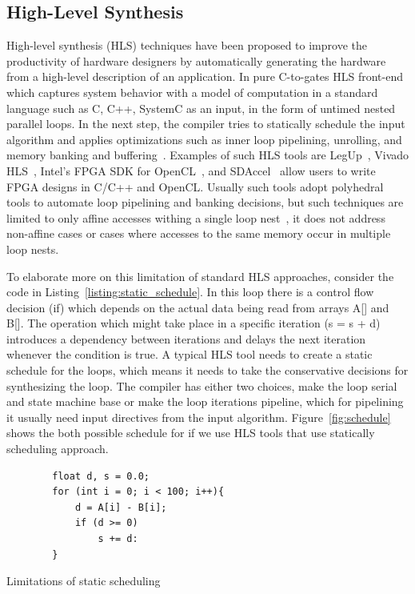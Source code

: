 \subsection{High-Level Synthesis}

High-level synthesis (HLS) techniques have been proposed to improve the productivity of hardware designers by automatically generating the hardware from a high-level description of an application.
In pure C-to-gates HLS front-end which captures system behavior with a model of computation in a standard language such as C, C++, SystemC as an input, in the form of untimed nested parallel loops.
In the next step, the compiler tries to statically schedule the input algorithm and applies optimizations such as inner loop pipelining, unrolling, and memory banking and buffering~\cite{chung_micro_2010, lee_1989_new, paulin_1989_force}.
Examples of such HLS tools are LegUp~\cite{canis_2011_legup}, Vivado HLS~\cite{vivadohls}, Intel’s FPGA SDK for OpenCL~\cite{opencl_sdk}, and SDAccel~\cite{sdaccel} allow users to write FPGA designs in C/C++ and OpenCL.
Usually such tools adopt polyhedral tools to automate loop pipelining and banking decisions, but such techniques are limited to only affine accesses withing a single loop nest~\cite{wang_2014_theory}, it does not address non-affine cases or cases where accesses to the same memory occur in multiple loop nests.

To elaborate more on this limitation of standard HLS approaches, consider the code in Listing~\ref{listing:static_schedule}.
In this loop there is a control flow decision (if) which depends on the actual data being read from arrays A[] and B[].
The operation which might take place in a specific iteration (s = s + d) introduces a dependency between iterations and delays the next iteration whenever the condition is true.
A typical HLS tool needs to create a static schedule for the loops, which means it needs to take the conservative decisions for synthesizing the loop. The compiler has either two choices, make the loop serial and state machine base or make the loop iterations pipeline, which for pipelining it usually need input directives from the input algorithm.
Figure~\ref{fig:schedule} shows the both possible schedule for if we use HLS tools that use statically scheduling approach.


\begin{listing}[ht]
    \begin{verbatim}
        float d, s = 0.0;
        for (int i = 0; i < 100; i++){
            d = A[i] - B[i];
            if (d >= 0)
                s += d:
        }
    \end{verbatim}
    \caption{Limitations of static scheduling}
    \label{listing:static_schedule}
\end{listing}


